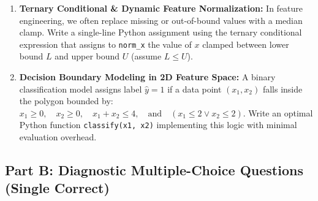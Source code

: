 \begin{enumerate}
    \item \textbf{Ternary Conditional \& Dynamic Feature Normalization:}
    In feature engineering, we often replace missing or out-of-bound values with a median clamp. Write a single-line Python assignment using the ternary conditional expression that assigns to \texttt{norm\_x} the value of $x$ clamped between lower bound $L$ and upper bound $U$ (assume $L \le U$).

    \item \textbf{Decision Boundary Modeling in 2D Feature Space:}
    A binary classification model assigns label $\hat{y} = 1$ if a data point $(x_1, x_2)$ falls inside the polygon bounded by:
    $x_1 \ge 0, \quad x_2 \ge 0, \quad x_1 + x_2 \le 4, \quad \text{and} \quad (x_1 \le 2 \lor x_2 \le 2)$.
    Write an optimal Python function \texttt{classify(x1, x2)} implementing this logic with minimal evaluation overhead.
\end{enumerate}

\subsection*{Part B: Diagnostic Multiple-Choice Questions (Single Correct)}

